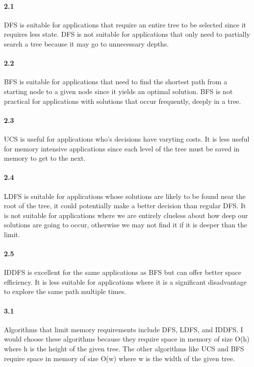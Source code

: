 \documentclass[12pt]{article}
\begin{document}
\paragraph{2.1}
DFS is suitable for applications that require an entire tree to be selected since it requires less state. DFS is not suitable for applications that only need to partially search a tree because it may go to unnecessary depths.
\paragraph{2.2}
BFS is suitable for applications that need to find the shortest path from a starting node to a given node since it yields an optimal solution. BFS is not practical for applications with solutions that occur frequently, deeply in a tree.
\paragraph{2.3}
UCS is useful for applications who's decisions have varyting costs. It is less useful for memory intensive applications since each level of the tree must be saved in memory to get to the next.
\paragraph{2.4}
LDFS is suitable for applications whose solutions are likely to be found near the root of the tree, it could potentially make a better decision than regular DFS. It is not suitable for applications where we are entirely clueless about how deep our solutions are going to occur, otherwise we may not find it if it is deeper than the limit.
\paragraph{2.5}
IDDFS is excellent for the same applications as BFS but can offer better space efficiency. It is less suitable for applications where it is a significant disadvantage to explore the same path multiple times.
\paragraph{3.1}
Algorithms that limit memory requirements include DFS, LDFS, and IDDFS. I would choose these algorithms because they require space in memory of size O(h) where h is the height of the given tree. The other algorithms like UCS and BFS require space in memory of size O(w) where w is the width of the given tree.
\end{document}
